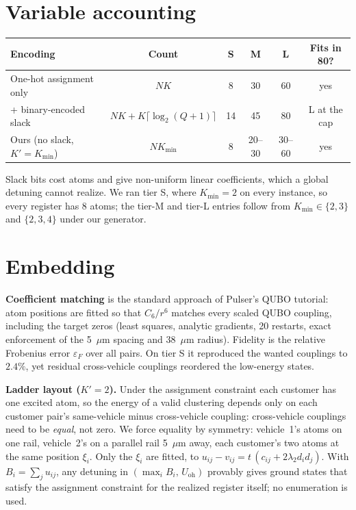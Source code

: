 \documentclass[10pt]{article}
\begin{document}
\section{Variable accounting}
\begin{center}\small
\begin{tabular}{@{}lccccc@{}}
\toprule
Encoding & Count & S & M & L & Fits in 80? \\
\midrule
One-hot assignment only & $NK$ & 8 & 30 & 60 & yes \\
+ binary-encoded slack & $NK+K\lceil\log_2(Q+1)\rceil$ & 14 & 45 & 80 & L at the cap \\
Ours (no slack, $K'=K_{\min}$) & $NK_{\min}$ & 8 & 20--30 & 30--60 & yes \\
\bottomrule
\end{tabular}
\end{center}
Slack bits cost atoms and give non-uniform linear coefficients, which a global detuning cannot realize. We ran tier S,
where $K_{\min}=2$ on every instance, so every register has 8 atoms; the tier-M and tier-L entries follow from
$K_{\min}\in\{2,3\}$ and $\{2,3,4\}$ under our generator.

\section{Embedding}
\textbf{Coefficient matching} is the standard approach of Pulser's QUBO tutorial: atom positions are fitted so that
$C_6/r^6$ matches every scaled QUBO coupling, including the target zeros (least squares, analytic gradients, 20
restarts, exact enforcement of the 5~$\mu$m spacing and 38~$\mu$m radius). Fidelity is the relative Frobenius error
$\varepsilon_F$ over all pairs. On tier S it reproduced the wanted couplings to $2.4\%$, yet residual cross-vehicle
couplings reordered the low-energy states.

\textbf{Ladder layout ($K'=2$).} Under the assignment constraint each customer has one excited atom, so the energy of
a valid clustering depends only on each customer pair's same-vehicle minus cross-vehicle coupling: cross-vehicle
couplings need to be \emph{equal}, not zero. We force equality by symmetry: vehicle~1's atoms on one rail, vehicle~2's
on a parallel rail 5~$\mu$m away, each customer's two atoms at the same position $\xi_i$. Only the $\xi_i$ are fitted, to
$u_{ij}-v_{ij}=t\,(c_{ij}+2\lambda_2d_id_j)$. With $B_i=\sum_ju_{ij}$, any detuning in $(\max_iB_i,\,U_{\mathrm{oh}})$ provably
gives ground states that satisfy the assignment constraint for the realized register itself; no enumeration is used.
\end{document}
